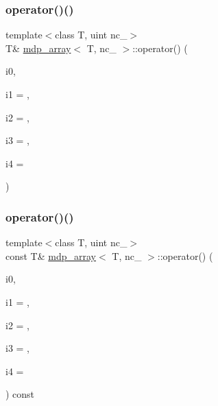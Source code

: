 \subsubsection{\texorpdfstring{operator()()}{operator()()}\hspace{0.1cm}{\footnotesize\ttfamily [1/2]}}
{\footnotesize\ttfamily template$<$class T, uint nc\+\_\+$>$ \\
T\& \hyperlink{classmdp__array}{mdp\+\_\+array}$<$ T, nc\+\_\+ $>$\+::operator() (\begin{DoxyParamCaption}\item[{const \hyperlink{mdp__global__vars_8h_a91ad9478d81a7aaf2593e8d9c3d06a14}{uint}}]{i0,  }\item[{const \hyperlink{mdp__global__vars_8h_a91ad9478d81a7aaf2593e8d9c3d06a14}{uint}}]{i1 = {},  }\item[{const \hyperlink{mdp__global__vars_8h_a91ad9478d81a7aaf2593e8d9c3d06a14}{uint}}]{i2 = {},  }\item[{const \hyperlink{mdp__global__vars_8h_a91ad9478d81a7aaf2593e8d9c3d06a14}{uint}}]{i3 = {},  }\item[{const \hyperlink{mdp__global__vars_8h_a91ad9478d81a7aaf2593e8d9c3d06a14}{uint}}]{i4 = {} }\end{DoxyParamCaption})\hspace{0.3cm}{\ttfamily [inline]}}

\mbox{\label{classmdp__array_a67d8b7a2082f77d8ddf245bdaaae520a}} 
\subsubsection{\texorpdfstring{operator()()}{operator()()}\hspace{0.1cm}{\footnotesize\ttfamily [2/2]}}
{\footnotesize\ttfamily template$<$class T, uint nc\+\_\+$>$ \\
const T\& \hyperlink{classmdp__array}{mdp\+\_\+array}$<$ T, nc\+\_\+ $>$\+::operator() (\begin{DoxyParamCaption}\item[{const \hyperlink{mdp__global__vars_8h_a91ad9478d81a7aaf2593e8d9c3d06a14}{uint}}]{i0,  }\item[{const \hyperlink{mdp__global__vars_8h_a91ad9478d81a7aaf2593e8d9c3d06a14}{uint}}]{i1 = {},  }\item[{const \hyperlink{mdp__global__vars_8h_a91ad9478d81a7aaf2593e8d9c3d06a14}{uint}}]{i2 = {},  }\item[{const \hyperlink{mdp__global__vars_8h_a91ad9478d81a7aaf2593e8d9c3d06a14}{uint}}]{i3 = {},  }\item[{const \hyperlink{mdp__global__vars_8h_a91ad9478d81a7aaf2593e8d9c3d06a14}{uint}}]{i4 = {} }\end{DoxyParamCaption}) const\hspace{0.3cm}{\ttfamily [inline]}}

